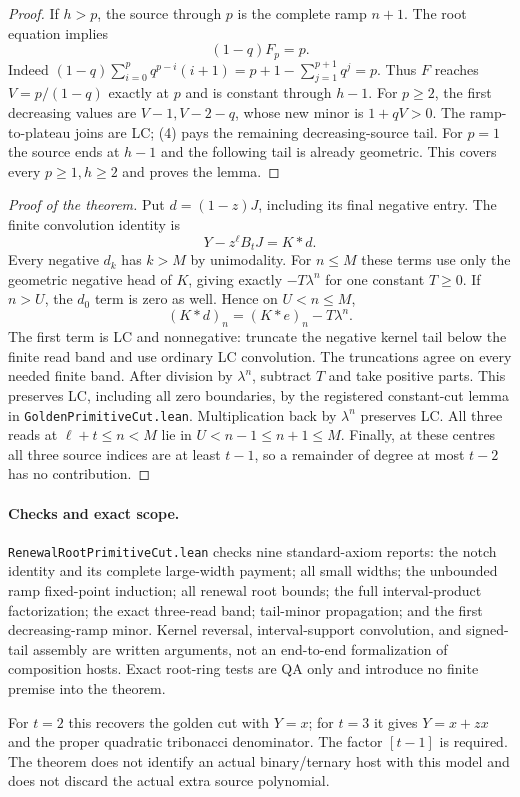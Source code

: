 \begin{proof}
If $h>p$, the source through $p$ is the complete ramp $n+1$.
The root equation implies
\[
 (1-q)F_p=p.
 \tag{5}
\]
Indeed $(1-q)\sum_{i=0}^pq^{p-i}(i+1)
=p+1-\sum_{j=1}^{p+1}q^j=p$. Thus $F$ reaches
$V=p/(1-q)$ exactly at $p$ and is constant through $h-1$.
For $p\ge2$, the first decreasing values are $V-1,V-2-q$,
whose new minor is $1+qV>0$. The ramp-to-plateau joins are LC;
(4) pays the remaining decreasing-source tail. For $p=1$ the
source ends at $h-1$ and the following tail is already geometric.
This covers every $p\ge1,h\ge2$ and proves the lemma.
\end{proof}

\begin{proof}[Proof of the theorem]
Put $d=(1-z)J$, including its final negative entry. The finite
convolution identity is
\[
                   Y-z^\ell B_tJ=K*d.                    \tag{6}
\]
Every negative $d_k$ has $k>M$ by unimodality. For $n\le M$
these terms use only the geometric negative head of $K$, giving
exactly $-T\lambda^n$ for one constant $T\ge0$. If $n>U$,
the $d_0$ term is zero as well. Hence on $U<n\le M$,
\[
             (K*d)_n=(K*e)_n-T\lambda^n.                \tag{7}
\]
The first term is LC and nonnegative: truncate the negative
kernel tail below the finite read band and use ordinary LC
convolution. The truncations agree on every needed finite band.
After division by $\lambda^n$, subtract $T$ and take positive
parts. This preserves LC, including all zero boundaries, by the
registered constant-cut lemma in \texttt{GoldenPrimitiveCut.lean}.
Multiplication back by $\lambda^n$ preserves LC. All three reads
at $\ell+t\le n<M$ lie in $U<n-1\le n+1\le M$.
Finally, at these centres all three source indices are at least
$t-1$, so a remainder of degree at most $t-2$ has no contribution.
\end{proof}

\paragraph{Checks and exact scope.}
\texttt{RenewalRootPrimitiveCut.lean} checks nine standard-axiom
reports: the notch identity and its complete large-width payment;
all small widths; the unbounded ramp fixed-point induction; all
renewal root bounds; the full interval-product factorization;
the exact three-read band; tail-minor propagation; and the first
decreasing-ramp minor. Kernel reversal, interval-support convolution,
and signed-tail assembly are written arguments, not an end-to-end
formalization of composition hosts. Exact root-ring tests are QA
only and introduce no finite premise into the theorem.

For $t=2$ this recovers the golden cut with $Y=x$; for $t=3$
it gives $Y=x+zx$ and the proper quadratic tribonacci denominator.
The factor $[t-1]$ is required. The theorem does not identify an
actual binary/ternary host with this model and does not discard
the actual extra source polynomial.
